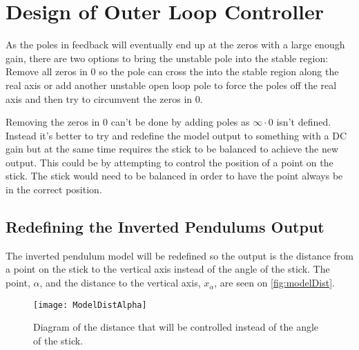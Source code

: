 \section{Design of Outer Loop Controller}
As the poles in feedback will eventually end up at the zeros with a large enough gain, there are two options to bring the unstable pole into the stable region: Remove all zeros in 0 so the pole can cross the into the stable region along the real axis or add another unstable open loop pole to force the poles off the real axis and then try to circumvent the zeros in 0. 

Removing the zeros in 0 can't be done by adding poles as $\infty \cdot 0$ isn't defined. Instead it's better to try and redefine the model output to something with a DC gain but at the same time requires the stick to be balanced to achieve the new output. This could be by attempting to control the position of a point on the stick. The stick would need to be balanced in order to have the point always be in the correct position.


\subsection{Redefining the Inverted Pendulums Output}
The inverted pendulum model will be redefined so the output is the distance from a point on the stick to the vertical axis instead of the angle of the stick. The point, $\alpha$, and the distance to the vertical axis, $x_\alpha$, are seen on \autoref{fig:modelDist}.

\begin{figure}[htbp]
\centering
\texttt{[image: ModelDistAlpha]}
\caption{Diagram of the distance that will be controlled instead of the angle of the stick.}
\label{fig:modelDist}
\end{figure}

